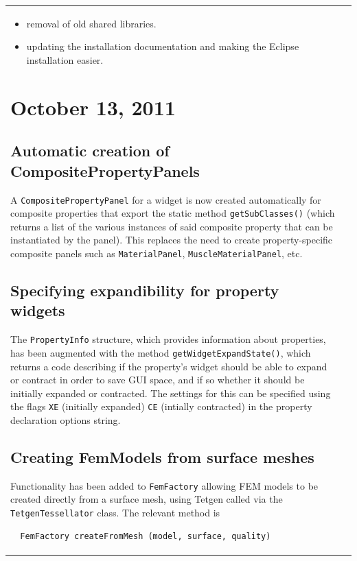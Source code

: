 \documentclass{article}
\begin{document}
\begin{tabular}{ll}
\begin{itemize}
\item removal of old shared libraries.

\item updating the installation documentation and making the Eclipse
  installation easier.

\end{itemize}

\section*{October 13, 2011}

\subsection*{Automatic creation of CompositePropertyPanels}

A {\tt CompositePropertyPanel} for a widget is now created automatically
for composite properties that export the static method
{\tt getSubClasses()} (which returns a list of the various instances of
said composite property that can be instantiated by the panel). This
replaces the need to create property-specific composite panels such as
{\tt MaterialPanel}, {\tt MuscleMaterialPanel}, etc.

\subsection*{Specifying expandibility for property widgets}

The {\tt PropertyInfo} structure, which provides information about
properties, has been augmented with the method
{\tt getWidget\-ExpandState()}, which returns a code describing if the
property's widget should be able to expand or contract in order to
save GUI space, and if so whether it should be initially expanded or
contracted. The settings for this can be specified using the flags
{\tt XE} (initially expanded) {\tt CE} (intially contracted) in the property
declaration options string.

\subsection*{Creating FemModels from surface meshes}

Functionality has been added to {\tt FemFactory} allowing FEM models to be
created directly from a surface mesh, using Tetgen called via the
{\tt TetgenTessellator} class. The relevant method is

\begin{verbatim}
  FemFactory createFromMesh (model, surface, quality)
\end{verbatim}


\end{tabular}
\end{document}

